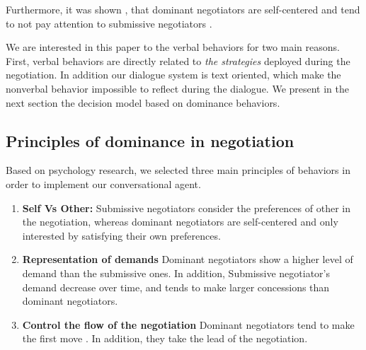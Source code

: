\documentclass{llncs}
\begin{document}
					 Furthermore, it was shown \cite{fiske1993controlling},\cite{de1995impact} that dominant negotiators are self-centered and tend to not pay attention to submissive negotiators .
%					
					\par We are interested in this paper to the verbal behaviors for two main reasons. First, verbal behaviors are directly related to \emph{the strategies} deployed during the negotiation. In addition our dialogue system is text oriented, which make the nonverbal behavior impossible to reflect during the dialogue. 
					We present in the next section the decision model based on dominance behaviors. 
					
					\subsection{Principles of dominance in negotiation}
					Based on psychology research, we selected three main principles of behaviors in order to implement our conversational agent.
					\begin{enumerate}
					 \item \textbf{Self Vs Other:} Submissive negotiators consider the preferences of other in the negotiation, whereas dominant negotiators  are self-centered and only interested by satisfying their own preferences.

					\item \textbf{Representation of demands} Dominant negotiators show a higher level of demand than the submissive ones. In addition,  Submissive negotiator's demand decrease over time, and tends to make larger concessions than dominant negotiators.

					\item \textbf{Control the flow of the negotiation}
					Dominant negotiators tend to make the first move \cite{magee2007power}. In addition, they take the lead of the negotiation.

					\end{enumerate}
					
						
\end{document}
